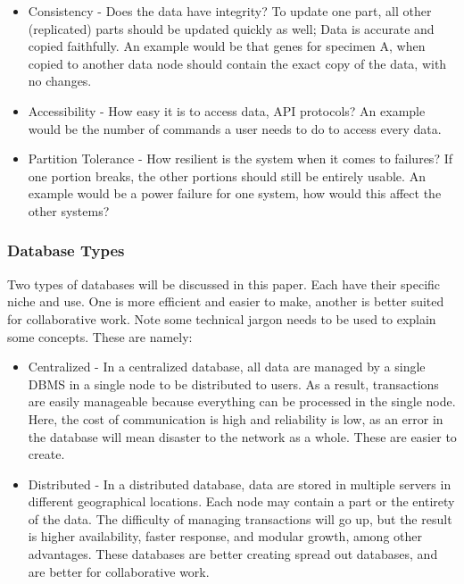 \documentclass{article}
\begin{document}
\begin{itemize}
    \item Consistency - Does the data have integrity? To update one part, all other (replicated) parts should be updated quickly as well; Data is accurate and copied faithfully. An example would be that genes for specimen A, when copied to another data node should contain the exact copy of the data, with no changes.
    \item Accessibility - How easy it is to access data, API protocols? An example would be the number of commands  a user needs to do to access every data.
    \item Partition Tolerance - How resilient is the system when it comes to failures? If one portion breaks, the other portions should still be entirely usable. An example would be a power failure for one system, how would this affect the other systems?
\end{itemize}

\subsubsection{Database Types} 
Two types of databases will be discussed in this paper. Each have their specific niche and use. One is more efficient and easier to make, another is better suited for collaborative work. Note some technical jargon needs to be used to explain some concepts. These are namely: \autocite{centralizedvsdistributed}

\begin{itemize}
    \item Centralized - In a centralized database, all data are managed by a single DBMS in a single node to be distributed to users. As a result, transactions are easily manageable because everything can be processed in the single node. Here, the cost of communication is high and reliability is low, as an error in the database will mean disaster to the network as a whole. These are easier to create.
    
    \item Distributed - In a distributed database, data are stored in multiple servers in different geographical locations. Each node may contain a part or the entirety of the data. The difficulty of managing transactions will go up, but the result is higher availability, faster response, and modular growth, among other advantages. These databases are better creating spread out databases, and are better for collaborative work.
\end{itemize}
\end{document}
